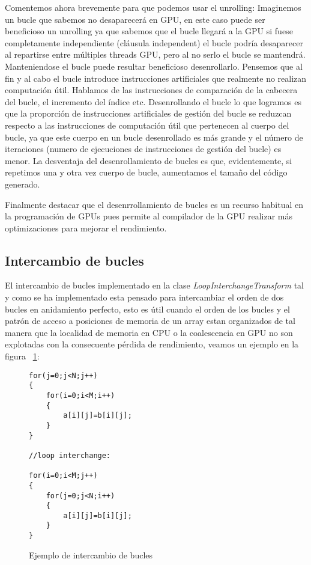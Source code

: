 Comentemos ahora brevemente para que podemos usar el unrolling: Imaginemos un bucle que sabemos no desaparecerá en GPU, en este caso puede ser beneficioso un unrolling ya que sabemos que el bucle llegará a la GPU si fuese completamente independiente (cláusula independent) el bucle podría desaparecer al repartirse entre múltiples threads GPU, pero al no serlo el bucle se mantendrá. Manteniendose el bucle puede resultar beneficioso desenrollarlo. Pensemos que al fin y al cabo el bucle introduce instrucciones artificiales que realmente no realizan computación útil. Hablamos de las instrucciones de comparación de la cabecera del bucle, el incremento del índice etc. Desenrollando el bucle lo que logramos es que la proporción de instrucciones artificiales de gestión del bucle se reduzcan respecto a las instrucciones de computación útil que pertenecen al cuerpo del bucle, ya que este cuerpo en un bucle desenrollado es más grande y el número de iteraciones (numero de ejecuciones de instrucciones de gestión del bucle) es menor.
La desventaja del desenrollamiento de bucles es que, evidentemente, si repetimos una y otra vez cuerpo de bucle, aumentamos el tamaño del código generado.

Finalmente destacar que el desenrrollamiento de bucles es un recurso habitual en la programación de GPUs pues permite al compilador de la GPU realizar más optimizaciones para mejorar el rendimiento.

\subsection{Intercambio de bucles}
El intercambio de bucles implementado en la clase \textit{LoopInterchangeTransform } tal y como se ha implementado esta pensado para intercambiar el orden de dos bucles en anidamiento perfecto, esto es útil cuando el orden de los bucles y el patrón de acceso a posiciones de memoria de un array estan organizados de tal manera que la localidad de memoria en CPU o la coalescencia en GPU no son explotadas con la consecuente pérdida de rendimiento, veamos un ejemplo en la figura ~\ref{FIG:InterchangeExample}:

\begin{figure}[t]
\begin{lstlisting}
for(j=0;j<N;j++)
{
	for(i=0;i<M;i++)
	{
		a[i][j]=b[i][j];
	}
}

//loop interchange:

for(i=0;i<M;j++)
{
	for(j=0;j<N;i++)
	{
		a[i][j]=b[i][j];
	}
}
\end{lstlisting}
\caption{Ejemplo de intercambio de bucles}
\label{FIG:InterchangeExample}
\end{figure}

